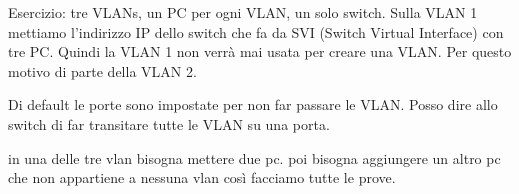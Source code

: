 \documentclass{article}
\begin{document}
    Esercizio: tre VLANs, un PC per ogni VLAN, un solo switch. Sulla VLAN 1 mettiamo l'indirizzo IP dello switch che fa da SVI (Switch Virtual Interface) con tre PC. Quindi la VLAN 1 non verrà mai usata per creare una VLAN. Per questo motivo di parte della VLAN 2.

    Di default le porte sono impostate per non far passare le VLAN. Posso dire allo switch di far transitare tutte le VLAN su una porta.

    in una delle tre vlan bisogna mettere due pc. poi bisogna aggiungere un altro pc che non appartiene a nessuna vlan così facciamo tutte le prove. 
\end{document}
